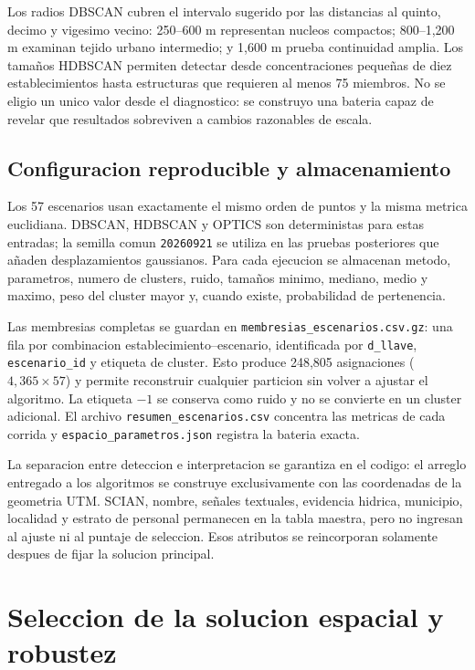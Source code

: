 \documentclass[11pt,letterpaper]{article}
\begin{document}
Los radios DBSCAN cubren el intervalo sugerido por las distancias al quinto, decimo y vigesimo vecino: 250--600 m representan nucleos compactos; 800--1,200 m examinan tejido urbano intermedio; y 1,600 m prueba continuidad amplia. Los tamaños HDBSCAN permiten detectar desde concentraciones pequeñas de diez establecimientos hasta estructuras que requieren al menos 75 miembros. No se eligio un unico valor desde el diagnostico: se construyo una bateria capaz de revelar que resultados sobreviven a cambios razonables de escala.

\subsection{Configuracion reproducible y almacenamiento}

Los 57 escenarios usan exactamente el mismo orden de puntos y la misma metrica euclidiana. DBSCAN, HDBSCAN y OPTICS son deterministas para estas entradas; la semilla comun \texttt{20260921} se utiliza en las pruebas posteriores que añaden desplazamientos gaussianos. Para cada ejecucion se almacenan metodo, parametros, numero de clusters, ruido, tamaños minimo, mediano, medio y maximo, peso del cluster mayor y, cuando existe, probabilidad de pertenencia.

Las membresias completas se guardan en \texttt{membresias\_escenarios.csv.gz}: una fila por combinacion establecimiento--escenario, identificada por \texttt{d\_llave}, \texttt{escenario\_id} y etiqueta de cluster. Esto produce 248,805 asignaciones ($4,365\times57$) y permite reconstruir cualquier particion sin volver a ajustar el algoritmo. La etiqueta $-1$ se conserva como ruido y no se convierte en un cluster adicional. El archivo \texttt{resumen\_escenarios.csv} concentra las metricas de cada corrida y \texttt{espacio\_parametros.json} registra la bateria exacta.

La separacion entre deteccion e interpretacion se garantiza en el codigo: el arreglo entregado a los algoritmos se construye exclusivamente con las coordenadas de la geometria UTM. SCIAN, nombre, señales textuales, evidencia hidrica, municipio, localidad y estrato de personal permanecen en la tabla maestra, pero no ingresan al ajuste ni al puntaje de seleccion. Esos atributos se reincorporan solamente despues de fijar la solucion principal.

\section{Seleccion de la solucion espacial y robustez}
\end{document}
